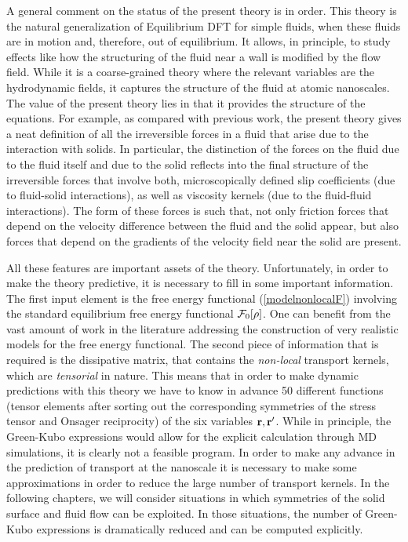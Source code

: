 \documentclass[b5paper,openright,11pt]{book}
\begin{document}
A  general comment  on the  status of the  present theory  is in
order.   This  theory is  the  natural  generalization of  Equilibrium
DFT for simple  fluids, when these fluids are in
motion and, therefore, out of equilibrium. It allows, in principle, to
study effects  like how the  structuring of the  fluid near a  wall is
modified by the flow field. While  it is a coarse-grained theory where
the relevant  variables are the  hydrodynamic fields, it  captures the
structure of the fluid at atomic nanoscales.  The value of the present
theory lies in  that it provides the structure of  the equations.  For
example, as  compared with previous  work, the present theory  gives a
neat definition of  all the irreversible forces in a  fluid that arise
due to the interaction with solids.  In particular, the distinction of
the forces on the  fluid due to the fluid itself and  due to the solid
reflects  into the  final structure  of the  irreversible forces  that
involve  both,  microscopically  defined  slip  coefficients  (due  to
fluid-solid interactions),  as well as  viscosity kernels (due  to the
fluid-fluid interactions).  The form of these forces is such that, not
only friction  forces that depend  on the velocity  difference between
the fluid  and the solid  appear, but also  forces that depend  on the
gradients of the velocity field near the solid are present.

All these features are important  assets of the theory. Unfortunately,
in order  to make the  theory predictive, it  is necessary to  fill in
some  important information.   The  first input  element  is the  free
energy  functional   (\ref{modelnonlocalF})  involving   the  standard
equilibrium  free  energy  functional  ${\cal  F}_0[\rho]$.   One  can
benefit from the vast amount of  work in the literature addressing the
construction   of  very   realistic   models  for   the  free   energy
functional. The  second piece of  information that is required  is the
dissipative  matrix, that  contains  the \textit{non-local}  transport
kernels, which are  \textit{tensorial} in nature.  This  means that in
order to make dynamic predictions with  this theory we have to know in
advance 50 different functions (tensor  elements after sorting out the
corresponding symmetries of the stress tensor and Onsager reciprocity)
of  the six  variables ${\bf  r},{\bf r}'$.   While in  principle, the
Green-Kubo  expressions  would  allow  for  the  explicit  calculation
through MD simulations, it is clearly not a feasible program. In order
to make any advance in the prediction of transport at the nanoscale it
is necessary to make some approximations  in order to reduce the large
number of transport  kernels.  In the following chapters,  we will consider situations
in  which symmetries  of  the  solid surface  and  fluid  flow can  be
exploited.  In those situations,  the number of Green-Kubo expressions
is dramatically reduced and can be computed explicitly.
\end{document}
